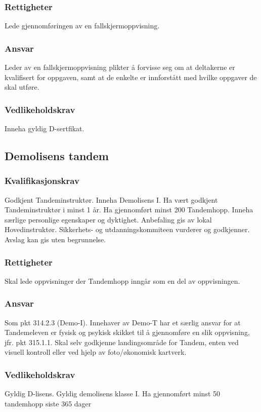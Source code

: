 \subsubsection{Rettigheter}
Lede gjennomføringen av en fallskjermoppvisning.

\subsubsection{Ansvar}
Leder av en fallskjermoppvisning plikter å forvisse seg om at deltakerne er kvalifisert for oppgaven, samt at de enkelte er innforstått med hvilke oppgaver de skal utføre.

\subsubsection{Vedlikeholdskrav}
Inneha gyldig D-sertfikat.

\subsection{Demolisens tandem}
\subsubsection{Kvalifikasjonskrav}
Godkjent Tandeminstruktør. Inneha Demolisens I. Ha vært godkjent Tandeminstruktør i minst 1 år. Ha gjennomført minst 200 Tandemhopp. Inneha særlige personlige egenskaper og dyktighet. Anbefaling gis av lokal Hovedinstruktør. Sikkerhets- og utdanningskommiteen vurderer og godkjenner. Avslag kan gis uten begrunnelse.

\subsubsection{Rettigheter}
Skal lede oppvisninger der Tandemhopp inngår som en del av oppvisningen.

\subsubsection{Ansvar}
Som pkt 314.2.3 (Demo-I). Innehaver av Demo-T har et særlig ansvar for at Tandemeleven er fysisk og psykisk skikket til å gjennomføre en slik oppvisning, jfr. pkt 315.1.1. Skal selv godkjenne landingsområde for Tandem, enten ved visuell kontroll eller ved hjelp av foto/økonomisk kartverk.

\subsubsection{Vedlikeholdskrav}
Gyldig D-lisens. Gyldig demolisens klasse I. Ha gjennomført minst 50 tandemhopp siste 365 dager

